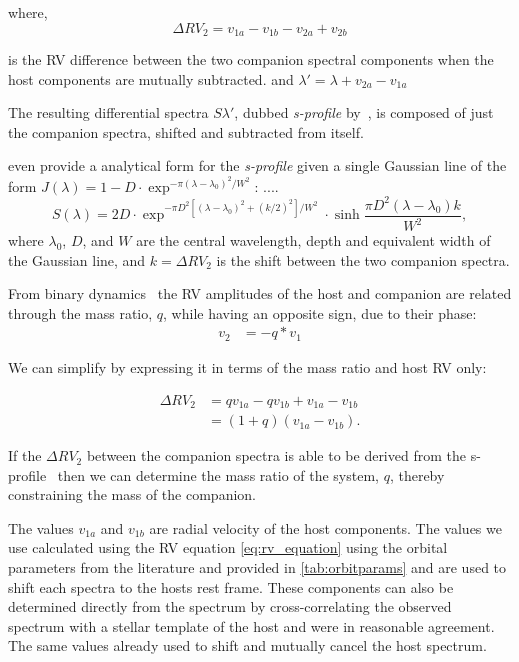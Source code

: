where,
\begin{equation}
\Delta {RV}_2 = v_{1a} - v_{1b} - v_{2a} + v_{2b} \label{eqn:companion_difference}
\end{equation}

is the {RV} difference between the two companion spectral components when the host components are mutually subtracted.
and \(\lambda' = \lambda + v_{2a}-v_{1a}\)

The resulting differential spectra \(S{\lambda'}\), dubbed \emph{s-profile} by~\citet{ferluga_separating_1997}, is composed of just the companion spectra, shifted and subtracted from itself.

\cite{ferluga_separating_1997} even provide a analytical form for the \emph{s-profile} given a single Gaussian line of the form
$J(\lambda) = 1- D \cdot\exp^{-\pi (\lambda - \lambda_0)^2 /W^2}$:
 ....\begin{equation}
 S(\lambda) = 2 D\cdot\exp^{-\pi D^2[(\lambda - \lambda_0)^2 +(k/2)^2]/W^2}\cdot \sinh{\frac{\pi D^2(\lambda-\lambda_0)k}{W^2}},\label{eqn:sprofile_gaussain}
 \end{equation}
where $\lambda_0$, $D$, and $W$ are the central wavelength, depth and equivalent width of the Gaussian line, and $k=\Delta {RV}_2 $ is the shift between the two companion spectra.


From binary dynamics~\citep[e.g.,][]{murray_keplerian_2010} the {RV} amplitudes of the host and companion are related through the mass ratio, \(q\), while having an opposite sign, due to their phase:
\begin{align}
v_{2} &= -q * v_{1} \label{eqn:q_relation}
\end{align}

We can simplify  by expressing it in terms of the mass ratio and host {RV} only:

\begin{align}
\Delta RV_2 &= q v_{1a} - q v_{1b} + v_{1a} - v_{1b} \nonumber \\
&= (1 + q)(v_{1a} - v_{1b}). \label{eqn:companion_difference_simplified}
\end{align}

If the \(\Delta {RV}_2\) between the companion spectra is able to be derived from the s-profile~\citep[see][]{ferluga_separating_1997} then we can determine the mass ratio of the system, \(q\), thereby constraining the mass of the companion.

The values \(v_{1a}\) and \(v_{1b}\) are radial velocity of the host components. The values we use calculated using the RV equation \ref{eq:rv_equation} using the orbital parameters from the literature and provided in \ref{tab:orbitparams} and are used to shift each spectra to the hosts rest frame. These components can also be determined directly from the spectrum by cross-correlating the observed spectrum with a stellar template of the host and were in reasonable agreement. The same values already used to shift and mutually cancel the host spectrum.

